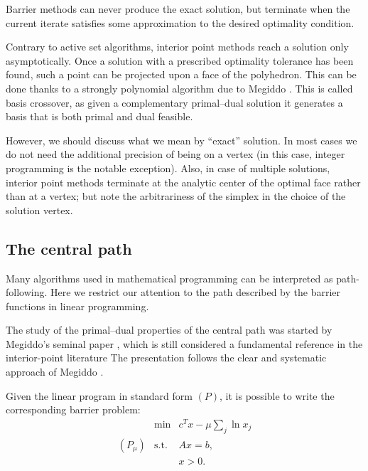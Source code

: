 \hrulefill

Barrier methods can never produce the exact solution, but terminate
when the current iterate satisfies some approximation to the desired
optimality condition.

Contrary to active set algorithms, interior point methods reach a
solution only asymptotically. 
Once a solution with a prescribed optimality tolerance has been found,
such a point can be projected upon a face of the polyhedron.
This can be done thanks to a strongly polynomial algorithm due
to Megiddo \cite{Megiddo91}. This is called basis crossover, 
as given a complementary primal--dual solution it generates a basis 
that is both primal and dual feasible.

However, we should discuss what we mean by ``exact'' solution. In most
cases we do not need the additional precision of being on a vertex (in
this case, integer programming is the notable exception).
Also, in case of multiple solutions, interior point methods terminate
at the analytic center of the optimal face rather than at a vertex; 
but note the arbitrariness of the simplex in the choice of the solution
vertex.

%
%
\subsection{The central path}
\label{sec:CentralPath}


Many algorithms used in mathematical programming can be interpreted 
as path-following. Here we restrict our attention to the path described by the 
barrier functions in linear programming.

The study of the primal--dual properties of the central path 
was started by Megiddo's seminal paper \cite{Megiddo}, which is 
still considered a fundamental reference in the interior-point literature
The presentation follows the clear and systematic approach of Megiddo
\cite{Megiddo}.

Given the linear program in standard form $(P)$,
it is possible to write the corresponding barrier problem:
\[
\begin{array}{crl}
         & \min        & c^Tx - \mu \sum_j \ln x_j \\
 (P_\mu) & \mbox{s.t.} & Ax = b, \\
         &             & x > 0.
\end{array}
\]

